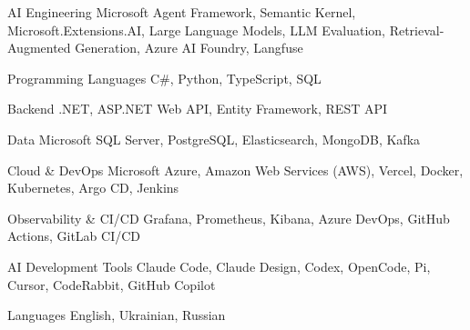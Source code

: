 

\begin{cvskills}

  \cvskill
    {AI Engineering} %
    {Microsoft Agent Framework, Semantic Kernel, Microsoft.Extensions.AI, Large Language Models, LLM Evaluation, Retrieval-Augmented Generation, Azure AI Foundry, Langfuse} %

  \cvskill
    {Programming Languages} %
    {C\#, Python, TypeScript, SQL} %

  \cvskill
    {Backend} %
    {.NET, ASP.NET Web API, Entity Framework, REST API} %

  \cvskill
    {Data} %
    {Microsoft SQL Server, PostgreSQL, Elasticsearch, MongoDB, Kafka} %

  \cvskill
    {Cloud \& DevOps} %
    {Microsoft Azure, Amazon Web Services (AWS), Vercel, Docker, Kubernetes, Argo CD, Jenkins} %

  \cvskill
    {Observability \& CI/CD} %
    {Grafana, Prometheus, Kibana, Azure DevOps, GitHub Actions, GitLab CI/CD} %

  \cvskill
    {AI Development Tools} %
    {Claude Code, Claude Design, Codex, OpenCode, Pi, Cursor, CodeRabbit, GitHub Copilot} %

  \cvskill
    {Languages} %
    {English, Ukrainian, Russian} %

\end{cvskills}
